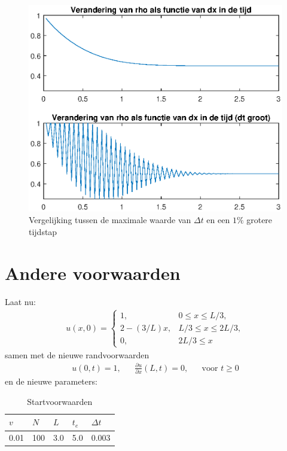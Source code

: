 \documentclass{article}
\newcommand{\Dt}{\Delta t}
\begin{document}
\begin{figure}[H]
\centering
\includegraphics[scale=0.8]{5.eps}
\caption{Vergelijking tussen de maximale waarde van $\Dt$ en een $1\%$ grotere tijdstap}
\end{figure}

\section*{Andere voorwaarden}
Laat nu: 
\begin{align*}
	u(x,0) =\begin{cases}
	1, & 0\leq x \leq L/3,\\
	2-(3/L)x, & L/3 \leq x\leq 2L/3,\\
	0, & 2L/3 \leq x
	\end{cases}
\end{align*}
samen met de nieuwe randvoorwaarden 
\begin{align*}
u(0,t)=1,&&\frac{\partial u}{\partial x}(L,t)=0,&&\mbox{voor }t\geq 0
\end{align*}
en de nieuwe parameters:
\begin{table}[H]
\centering
\label{tab:specs2}
\begin{tabular}{|l|l|l|l|l|}
\hline
\(v\) & \(N\) & \(L\) & \(t_e\) & \(\Dt\) \\ \hline
 0.01 & 100 & 3.0 & 5.0 & 0.003 \\ \hline
\end{tabular}
\caption{Startvoorwaarden}
\end{table}
\end{document}
